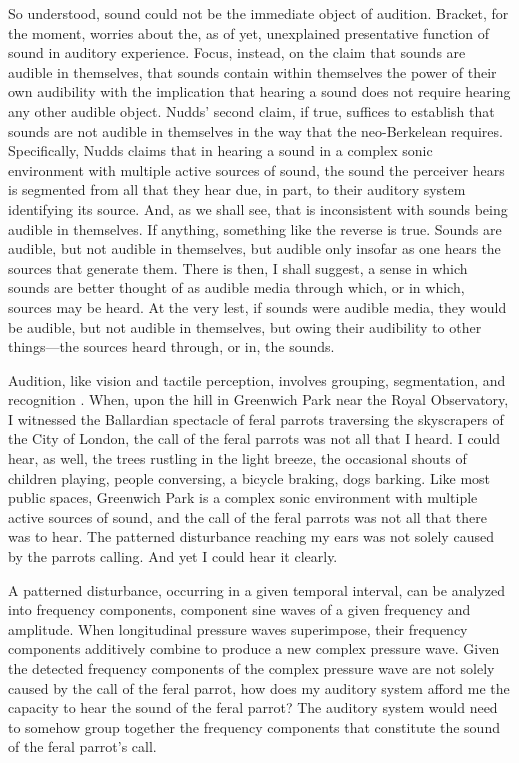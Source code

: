 So understood, sound could not be the immediate object of audition. Bracket, for the moment, worries about the, as of yet, unexplained presentative function of sound in auditory experience. Focus, instead, on the claim that sounds are audible in themselves, that sounds contain within themselves the power of their own audibility with the implication that hearing a sound does not require hearing any other audible object. Nudds' second claim, if true, suffices to establish that sounds are not audible in themselves in the way that the neo-Berkelean requires. Specifically, Nudds claims that in hearing a sound in a complex sonic environment with multiple active sources of sound, the sound the perceiver hears is segmented from all that they hear due, in part, to their auditory system identifying its source. And, as we shall see, that is inconsistent with sounds being audible in themselves. If anything, something like the reverse is true. Sounds are audible, but not audible in themselves, but audible only insofar as one hears the sources that generate them. There is then, I shall suggest, a sense in which sounds are better thought of as audible media through which, or in which, sources may be heard. At the very lest, if sounds were audible media, they would be audible, but not audible in themselves, but owing their audibility to other things---the sources heard through, or in, the sounds.

Audition, like vision and tactile perception, involves grouping, segmentation, and recognition \citep{Bregman:1990aa}. When, upon the hill in Greenwich Park near the Royal Observatory, I witnessed the Ballardian spectacle of feral parrots traversing the skyscrapers of the City of London, the call of the feral parrots was not all that I heard. I could hear, as well, the trees rustling in the light breeze, the occasional shouts of children playing, people conversing, a bicycle braking, dogs barking. Like most public spaces, Greenwich Park is a complex sonic environment with multiple active sources of sound, and the call of the feral parrots was not all that there was to hear. The patterned disturbance reaching my ears was not solely caused by the parrots calling. And yet I could hear it clearly.

A patterned disturbance, occurring in a given temporal interval, can be analyzed into frequency components, component sine waves of a given frequency and amplitude. When longitudinal pressure waves superimpose, their frequency components additively combine to produce a new complex pressure wave. Given the detected frequency components of the complex pressure wave are not solely caused by the call of the feral parrot, how does my auditory system afford me the capacity to hear the sound of the feral parrot? The auditory system would need to somehow group together the frequency components that constitute the sound of the feral parrot's call.

